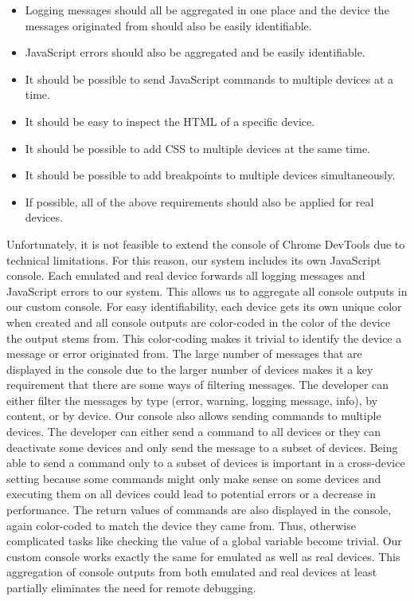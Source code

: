 \begin{itemize}
	\item Logging messages should all be aggregated in one place and the device the messages originated from should also be easily identifiable.
	\item JavaScript errors should also be aggregated and be easily identifiable.
	\item It should be possible to send JavaScript commands to multiple devices at a time. 
	\item It should be easy to inspect the HTML of a specific device.
	\item It should be possible to add CSS to multiple devices at the same time.
	\item It should be possible to add breakpoints to multiple devices simultaneously.
	\item If possible, all of the above requirements should also be applied for real devices.
\end{itemize}

Unfortunately, it is not feasible to extend the console of Chrome DevTools due to technical limitations. For this reason, our system includes its own JavaScript console. Each emulated and real device forwards all logging messages and JavaScript errors to our system. This allows us to aggregate all console outputs in our custom console. For easy identifiability, each device gets its own unique color when created and all console outputs are color-coded in the color of the device the output stems from. This color-coding makes it trivial to identify the device a message or error originated from. The large number of messages that are displayed in the console due to the larger number of devices makes it a key requirement that there are some ways of filtering messages. The developer can either filter the messages by type (error, warning, logging message, info), by content, or by device. Our console also allows sending commands to multiple devices. The developer can either send a command to all devices or they can deactivate some devices and only send the message to a subset of devices. Being able to send a command only to a subset of devices is important in a cross-device setting because some commands might only make sense on some devices and executing them on all devices could lead to potential errors or a decrease in performance. The return values of commands are also displayed in the console, again color-coded to match the device they came from. Thus, otherwise complicated tasks like checking the value of a global variable become trivial. Our custom console works exactly the same for emulated as well as real devices. This aggregation of console outputs from both emulated and real devices at least partially eliminates the need for remote debugging.

